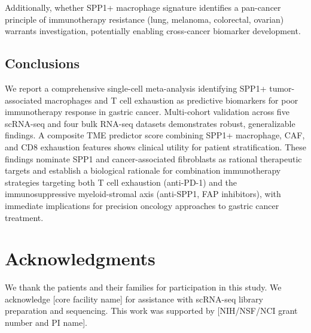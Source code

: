 \documentclass[12pt,twoside]{article}
\begin{document}
Additionally, whether SPP1+ macrophage signature identifies a pan-cancer principle of immunotherapy resistance (lung, melanoma, colorectal, ovarian) warrants investigation, potentially enabling cross-cancer biomarker development.

\subsection{Conclusions}

We report a comprehensive single-cell meta-analysis identifying SPP1+ tumor-associated macrophages and T cell exhaustion as predictive biomarkers for poor immunotherapy response in gastric cancer. Multi-cohort validation across five scRNA-seq and four bulk RNA-seq datasets demonstrates robust, generalizable findings. A composite TME predictor score combining SPP1+ macrophage, CAF, and CD8 exhaustion features shows clinical utility for patient stratification. These findings nominate SPP1 and cancer-associated fibroblasts as rational therapeutic targets and establish a biological rationale for combination immunotherapy strategies targeting both T cell exhaustion (anti-PD-1) and the immunosuppressive myeloid-stromal axis (anti-SPP1, FAP inhibitors), with immediate implications for precision oncology approaches to gastric cancer treatment.


\section*{Acknowledgments}

We thank the patients and their families for participation in this study. We acknowledge [core facility name] for assistance with scRNA-seq library preparation and sequencing. This work was supported by [NIH/NSF/NCI grant number and PI name].





\end{document}
